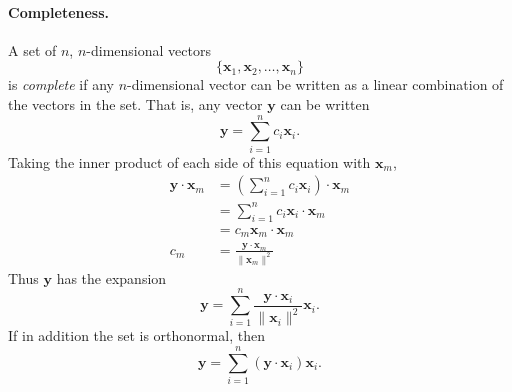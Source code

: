 \paragraph{Completeness.}
A set of $n$, $n$-dimensional vectors
\[
\{\mathbf{x}_1, \mathbf{x}_2, \ldots, \mathbf{x}_n\}
\]
is \textit{complete} if any $n$-dimensional
vector can be written as a linear combination of the vectors in the set.
That is, any vector $\mathbf{y}$ can be written
\[
\mathbf{y} = \sum_{i=1}^n c_i \mathbf{x}_i.
\]
Taking the inner product of each side of this equation with $\mathbf{x}_m$,
\begin{align*}
\mathbf{y} \cdot \mathbf{x}_m &= \left( \sum_{i=1}^n c_i \mathbf{x}_i \right)
        \cdot \mathbf{x}_m \\
        &= \sum_{i=1}^n c_i \mathbf{x}_i \cdot \mathbf{x}_m \\
        &= c_m \mathbf{x}_m \cdot \mathbf{x}_m \\
c_m     &= \frac{\mathbf{y} \cdot \mathbf{x}_m }{\| \mathbf{x}_m \|^2}
\end{align*}
Thus $\mathbf{y}$ has the expansion
\[
\mathbf{y} = \sum_{i=1}^n \frac{\mathbf{y} \cdot \mathbf{x}_i }{\| \mathbf{x}_i \|^2} \mathbf{x}_i.
\]
If in addition the set is orthonormal, then
\[
\mathbf{y} = \sum_{i=1}^n (\mathbf{y} \cdot \mathbf{x}_i) \mathbf{x}_i.
\]














